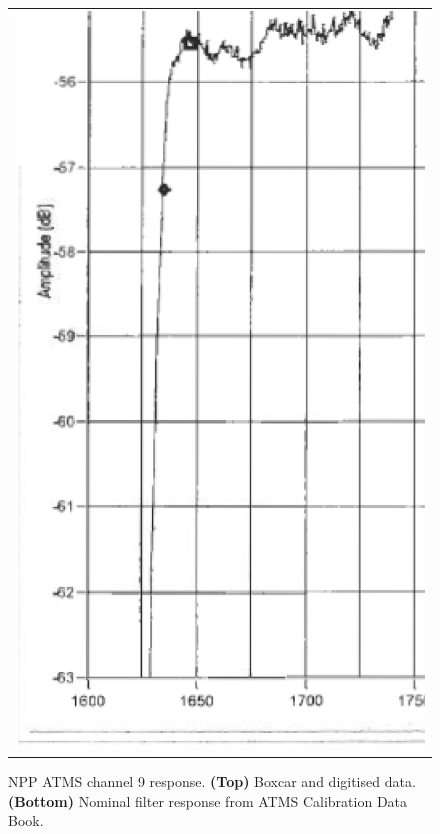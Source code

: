\begin{figure}[H]
\begin{tabular}{c}
    \includegraphics[bb=249 194 1431 1035,scale=0.3]{graphics/log_book/ch9.eps}
  \end{tabular}
  \caption{NPP ATMS channel 9 response. \textbf{(Top)} Boxcar and digitised data. \textbf{(Bottom)} Nominal filter response from ATMS Calibration Data Book\cite{ATMS_PFM_CalLog}.}
  \label{fig:atms_npp.ch9.srf}
\end{figure}

